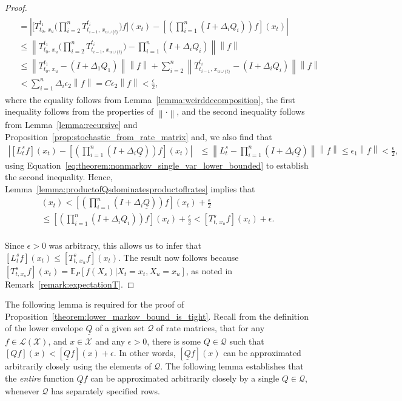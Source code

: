 \documentclass[10pt,a4paper]{paper}
\theoremstyle{definition}
\newcommand{\states}{\mathcal{X}}
\newcommand{\gambles}{\mathcal{L}}
\newcommand{\gamblesX}{\gambles(\states)}
\newcommand{\rateset}{\mathcal{Q}}
\newcommand{\lrate}{\underline{Q}}
\newcommand{\norm}[1]{\left\lVert #1 \right\rVert}
\newcommand{\abs}[1]{\left\vert #1 \right\vert}
\begin{document}
\begin{proof}
\begin{multline*}
\begin{aligned}
&=\abs{\Big[T_{t_0,\,x_u}^{t_1}\Bigg(\prod_{i=2}^{n}T_{t_{i-1},\,x_{u\cup\{t\}}}^{t_{i}}\Bigg)f\Big](x_t)
-\left[\left(\prod_{i=1}^n(I+\Delta_iQ_i)\right)f\right](x_t)}\\
&\leq\norm{T_{t_0,\,x_u}^{t_1}\Bigg(\prod_{i=2}^{n}T_{t_{i-1},\,x_{u\cup\{t\}}}^{t_{i}}\Bigg)
-\prod_{i=1}^n(I+\Delta_iQ_i)}\norm{f}\\
&\leq
\norm{T_{t_0,\,x_u}^{t_1}-(I+\Delta_1Q_1)}\norm{f}
+\sum_{i=2}^{n}
\norm{T_{t_{i-1},\,x_{u\cup\{t\}}}^{t_{i}}-(I+\Delta_iQ_i)}\norm{f}\\
&<\sum_{i=1}^n\Delta_i\epsilon_2\norm{f}=C\epsilon_2\norm{f}<\frac{\epsilon}{2},
\end{aligned}
\end{multline*}
where the equality follows from Lemma~\ref{lemma:weirddecomposition}, the first inequality follows from the properties of $\norm{\cdot}$, and the second inequality follows from Lemma~\ref{lemma:recursive} and Proposition~\ref{prop:stochastic_from_rate_matrix} and, we also find that
\begin{align*}
\abs{[L_t^sf](x_t)-\left[\left(\prod_{i=1}^n(I+\Delta_i\lrate)\right)f\right](x_t)}
&\leq
\norm{L_t^s-\prod_{i=1}^n(I+\Delta_i\lrate)}\norm{f}\leq\epsilon_1\norm{f}<\frac{\epsilon}{2},
\end{align*}
using Equation~\eqref{eq:theorem:nonmarkov_single_var_lower_bounded} to establish the second inequality. Hence, Lemma~\ref{lemma:productofQsdominatesproductoflrates} implies that
\begin{multline*}
[L_{t}^s f](x_t)
<\left[\left(\prod_{i=1}^n(I+\Delta_i\lrate)\right)f\right](x_t)+\frac{\epsilon}{2}\\
\leq
\left[\left(\prod_{i=1}^n(I+\Delta_i Q_i)\right)f\right](x_t)+\frac{\epsilon}{2}
<[T_{t,\,x_u}^sf](x_t)+\epsilon.
\end{multline*}\\[-0pt]
Since $\epsilon>0$ was arbitrary, this allows us to infer that $[L_{t}^s f](x_t)\leq [T_{t,\,x_u}^sf](x_t)$. The result now follows because $[T_{t,x_u}^sf](x_t)=\mathbb{E}_P[f(X_s)\vert X_t=x_t,X_u=x_u]$, as noted in Remark~\ref{remark:expectationT}.
\end{proof}


The following lemma is required for the proof of Proposition~\ref{theorem:lower_markov_bound_is_tight}. Recall from the definition of the lower envelope $\lrate$ of a given set $\rateset$ of rate matrices, that for any $f\in\gamblesX$, and $x\in\states$ and any $\epsilon>0$, there is some $Q\in\rateset$ such that $[Qf](x)<[\lrate f](x)+\epsilon$. In other words, $[\lrate f](x)$ can be approximated arbitrarily closely using the elements of $\rateset$. The following lemma establishes that the \emph{entire} function $\lrate f$ can be approximated arbitrarily closely by a single $Q\in\rateset$, whenever $\rateset$ has separately specified rows.
\end{document}
